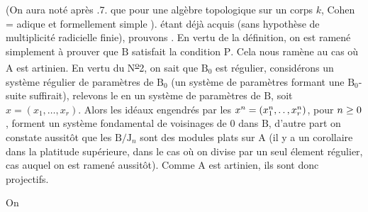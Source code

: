 (On aura noté  après .7. que pour une algèbre topologique sur un corps $k$, Cohen = adique et formellement simple ).  étant déjà acquis (sans hypothèse de multiplicité radicielle finie), prouvons . En vertu de la définition, on est ramené simplement à prouver que $\mathrm B$ satisfait la condition $\mathrm P$. Cela nous ramène au cas où $\mathrm A$ est artinien. En vertu du N\textsuperscript{\uline{o}}2, on sait que $\mathrm B_0$ est régulier, considérons un système régulier de paramètres de $\mathrm B_0$ (un système de paramètres formant une $\mathrm B_0$-suite suffirait), relevons le en un système de paramètres de $\mathrm B$, soit $x=(x_1,\ldots,x_r)$. Alors les idéaux engendrés par les $x^n=(x_1^n,\ldotp\ldotp,x_r^n)$, pour $n\geq0$, forment un système fondamental de voisinages  de 0  dans $\mathrm B$, d'autre part on constate aussitôt que les $\mathrm B/\mathrm J_n$ sont des modules plats sur $\mathrm A$ (il y a un  corollaire dans la platitude supérieure, dans le cas où on divise par un seul élement  régulier, cas auquel on est ramené aussitôt). Comme $\mathrm A$ est artinien, ils sont donc projectifs.  

\margin{\handwritten{$\Vert$}} On

